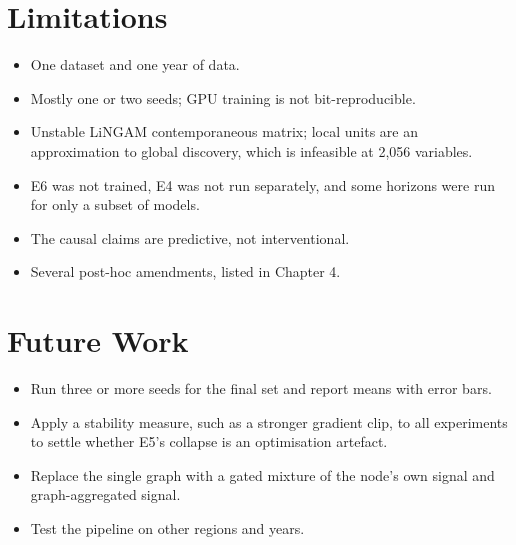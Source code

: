 \documentclass[MTech]{ugthesis}
\begin{document}
\section{Limitations}
\begin{itemize}
\item One dataset and one year of data.
\item Mostly one or two seeds; GPU training is not bit-reproducible.
\item Unstable LiNGAM contemporaneous matrix; local units are an approximation to global discovery, which is infeasible at 2,056 variables.
\item E6 was not trained, E4 was not run separately, and some horizons were run for only a subset of models.
\item The causal claims are predictive, not interventional.
\item Several post-hoc amendments, listed in Chapter 4.
\end{itemize}

\section{Future Work}
\begin{itemize}
\item Run three or more seeds for the final set and report means with error bars.
\item Apply a stability measure, such as a stronger gradient clip, to all experiments to settle whether E5's collapse is an optimisation artefact.
\item Replace the single graph with a gated mixture of the node's own signal and graph-aggregated signal.
\item Test the pipeline on other regions and years.
\end{itemize}
\end{document}
